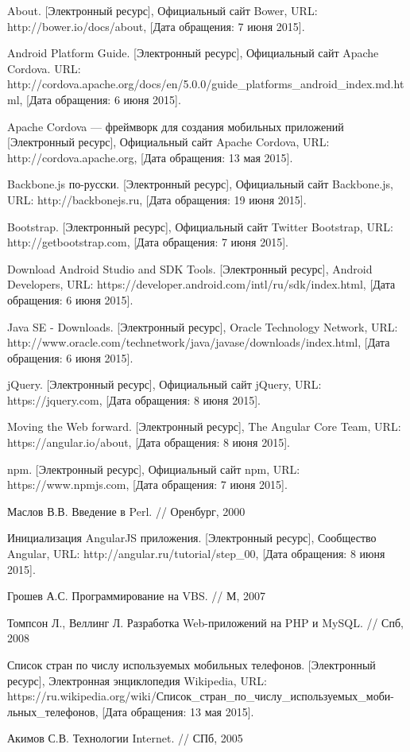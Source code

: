\begin{thebibliography}{1}
 About. [Электронный ресурс], Официальный сайт Bower, URL: http://bower.io/docs/about, [Дата обращения: 7 июня 2015].

 Android Platform Guide. [Электронный ресурс],  Официальный сайт Apache Cordova. URL: http://cordova.apache.org/docs/en/5.0.0/guide\_platforms\_android\_index.md.html, [Дата обращения: 6 июня 2015].

 Apache Cordova --- фреймворк для создания мобильных приложений [Электронный ресурс], Официальный сайт Apache Cordova, URL: http://cordova.apache.org, [Дата обращения: 13 мая 2015].

 Backbone.js по-русски. [Электронный ресурс], Официальный сайт Backbone.js, URL: http://backbonejs.ru, [Дата обращения: 19 июня 2015].

 Bootstrap. [Электронный ресурс], Официальный сайт  Twitter Bootstrap, URL: http://getbootstrap.com, [Дата обращения: 7 июня 2015].

 Download Android Studio and SDK Tools. [Электронный ресурс], Android Developers, URL: https://developer.android.com/intl/ru/sdk/index.html, [Дата обращения: 6 июня 2015].

 Java SE - Downloads. [Электронный ресурс], Oracle Technology Network, URL: http://www.oracle.com/technetwork/java/javase/downloads/index.html, [Дата обращения: 6 июня 2015].

 jQuery. [Электронный ресурс], Официальный сайт jQuery, URL: https://jquery.com, [Дата обращения: 8 июня 2015].

 Moving the Web forward. [Электронный ресурс], The Angular Core Team, URL: https://angular.io/about, [Дата обращения: 8 июня 2015].

 npm. [Электронный ресурс], Официальный сайт npm, URL: https://www.npmjs.com, [Дата обращения: 7 июня 2015].

 Маслов В.В. Введение в Perl. // Оренбург, 2000

 Инициализация AngularJS приложения. [Электронный ресурс], Сообщество Angular, URL: http://angular.ru/tutorial/step\_00, [Дата обращения: 8 июня 2015].

 Грошев А.С. Программирование на VBS. // М, 2007

 Томпсон Л., Веллинг Л. Разработка Web-приложений на PHP и MySQL. // Спб, 2008

 Список стран по числу используемых мобильных телефонов. [Электронный ресурс], Электронная энциклопедия Wikipedia, URL: https://ru.wikipedia.org/wiki/Список\_стран\_по\_числу\_используемых\_моби- льных\_телефонов, [Дата обращения: 13 мая 2015].

 Акимов С.В. Технологии Internet. // СПб, 2005
\end{thebibliography}
